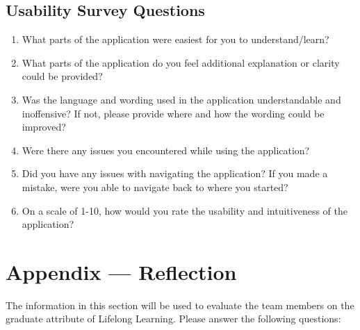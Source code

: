 \documentclass[12pt, titlepage]{article}
\begin{document}
\subsection{Usability Survey Questions}

\begin{enumerate}
  \item What parts of the application were easiest for you to understand/learn?
  \item What parts of the application do you feel additional explanation or clarity could be provided?
  \item Was the language and wording used in the application understandable and inoffensive? If not, please
  provide where and how the wording could be improved?
  \item Were there any issues you encountered while using the application?
  \item Did you have any issues with navigating the application? If you made a mistake, were you able to navigate
  back to where you started?
  \item On a scale of 1-10, how would you rate the usability and intuitiveness of the application?
\end{enumerate}

\newpage{}
\section*{Appendix --- Reflection}

The information in this section will be used to evaluate the team members on the
graduate attribute of Lifelong Learning.  Please answer the following questions:
\end{document}
